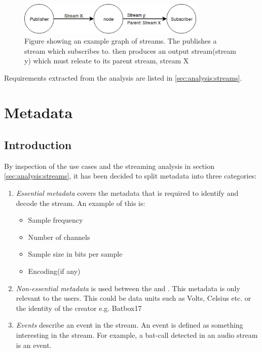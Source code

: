 \begin{figure}[h!]
	\centering
	\includegraphics[width=0.8\textwidth]{figures/stream-graph}
	\caption{Figure showing an example graph of streams. The  publishes a stream which  subscribes to.  then produces an output stream(stream y) which must releate to its parent stream, stream X} \label{fig:analysis:graph}
\end{figure}

Requirements extracted from the analysis are listed in \ref{sec:analysis:streams}.

\section{Metadata} \label{sec:analysis:metadata}
\subsection{Introduction}

By inspection of the use cases and the streaming analysis in section \ref{sec:analysis:streams}, it has been decided to split metadata into three categories:
\begin{enumerate}
	\item \textit{Essential metadata} covers the metadata that is required to identify and decode the stream.
		An example of this is:
		\begin{itemize}
			\item Sample frequency
			\item Number of channels
			\item Sample size in bits per sample
			\item Encoding(if any)
		\end{itemize}
	\item \textit{Non-essential metadata} is used between the  and . This metadata is only relevant to the users. This could be data units such as Volts, Celsius etc. or the identity of the creator e.g. Batbox17
	\item \textit{Events} describe an event in the stream. An event is defined as something interesting in the stream. For example, a bat-call detected in an audio stream is an event.
\end{enumerate}

